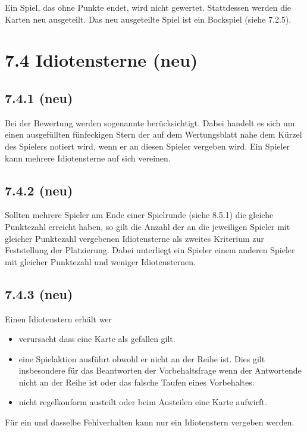 Ein Spiel, das ohne Punkte endet, wird nicht gewertet. Stattdessen
werden die Karten neu ausgeteilt. Das neu ausgeteilte Spiel ist ein
Bockspiel (siehe 7.2.5).

\section*{7.4 Idiotensterne (neu)}

\subsection*{7.4.1 (neu)}

Bei der Bewertung werden sogenannte  berücksichtigt. Dabei
handelt es sich um einen ausgefüllten fünfeckigen Stern der auf dem
Wertungsblatt nahe dem Kürzel des Spielers notiert wird, wenn er an diesen
Spieler vergeben wird. Ein Spieler kann mehrere Idiotensterne auf sich vereinen.

\subsection*{7.4.2 (neu)}

Sollten mehrere Spieler am Ende einer Spielrunde (siehe 8.5.1) die gleiche
Punktezahl erreicht haben, so gilt die Anzahl der an die jeweiligen Spieler mit
gleicher Punktezahl vergebenen Idiotensterne als zweites Kriterium zur
Feststellung der Platzierung. Dabei unterliegt ein Spieler einem anderen Spieler
mit gleicher Punktezahl und weniger Idiotensternen.

\subsection*{7.4.3 (neu)}

Einen Idiotenstern erhält wer
\begin{itemize}
    \item{verursacht dass eine Karte als gefallen gilt.}
    \item{eine Spielaktion ausführt obwohl er nicht an der Reihe ist. Dies gilt
        insbesondere für das Beantworten der Vorbehaltsfrage wenn der
        Antwortende nicht an der Reihe ist oder das falsche Taufen eines
        Vorbehaltes.}
    \item{nicht regelkonform austeilt oder beim Austeilen eine Karte aufwirft.}
\end{itemize}

Für ein und dasselbe Fehlverhalten kann nur ein Idiotenstern vergeben werden.

